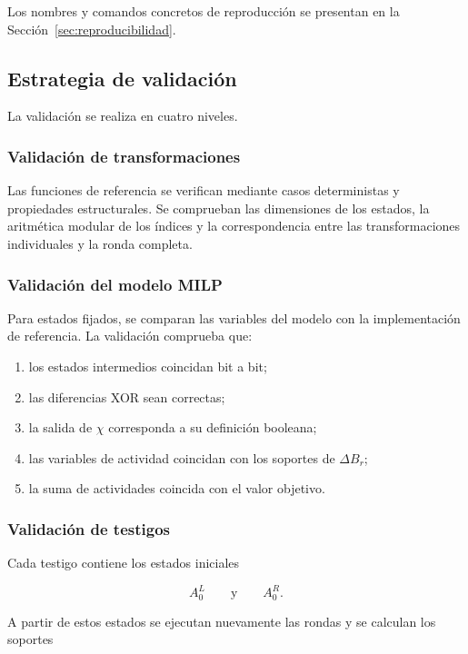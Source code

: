 Los nombres y comandos concretos de reproducción se presentan en la
Sección~\ref{sec:reproducibilidad}.


\subsection{Estrategia de validación}
\label{subsec:estrategia_validacion}

La validación se realiza en cuatro niveles.


\subsubsection{Validación de transformaciones}

Las funciones de referencia se verifican mediante casos deterministas y
propiedades estructurales. Se comprueban las dimensiones de los estados,
la aritmética modular de los índices y la correspondencia entre las
transformaciones individuales y la ronda completa.


\subsubsection{Validación del modelo MILP}

Para estados fijados, se comparan las variables del modelo con la
implementación de referencia. La validación comprueba que:

\begin{enumerate}
    \item los estados intermedios coincidan bit a bit;
    \item las diferencias XOR sean correctas;
    \item la salida de $\chi$ corresponda a su definición booleana;
    \item las variables de actividad coincidan con los soportes de
    $\Delta B_r$;
    \item la suma de actividades coincida con el valor objetivo.
\end{enumerate}


\subsubsection{Validación de testigos}

Cada testigo contiene los estados iniciales

\[
A_0^L
\qquad \text{y} \qquad
A_0^R.
\]

A partir de estos estados se ejecutan nuevamente las rondas y se calculan
los soportes

